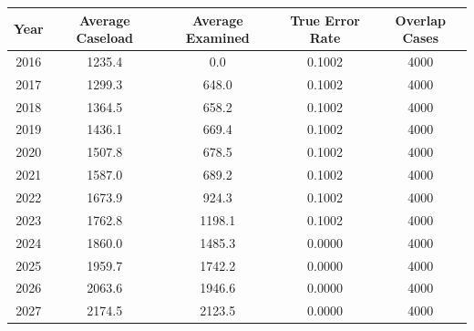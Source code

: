 \begin{tabular}{ccccc}
\hline
\textbf{Year} & \textbf{Average Caseload} & \textbf{Average Examined} & \textbf{True Error Rate} & \textbf{Overlap Cases} \\
\hline
2016 & 1235.4 & 0.0 & 0.1002 & 4000 \\
2017 & 1299.3 & 648.0 & 0.1002 & 4000 \\
2018 & 1364.5 & 658.2 & 0.1002 & 4000 \\
2019 & 1436.1 & 669.4 & 0.1002 & 4000 \\
2020 & 1507.8 & 678.5 & 0.1002 & 4000 \\
2021 & 1587.0 & 689.2 & 0.1002 & 4000 \\
2022 & 1673.9 & 924.3 & 0.1002 & 4000 \\
2023 & 1762.8 & 1198.1 & 0.1002 & 4000 \\
2024 & 1860.0 & 1485.3 & 0.0000 & 4000 \\
2025 & 1959.7 & 1742.2 & 0.0000 & 4000 \\
2026 & 2063.6 & 1946.6 & 0.0000 & 4000 \\
2027 & 2174.5 & 2123.5 & 0.0000 & 4000 \\
\hline
\end{tabular}
